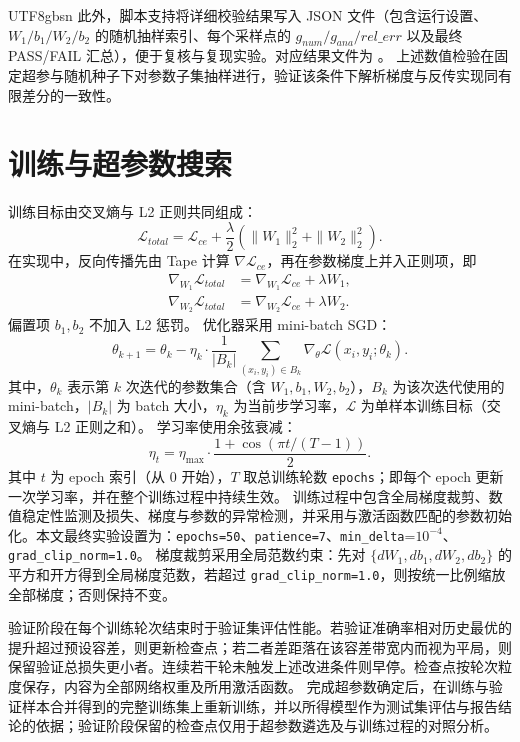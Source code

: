 \documentclass[11pt]{article}
\begin{document}
\begin{CJK*}{UTF8}{gbsn}
此外，脚本支持将详细校验结果写入 JSON 文件（包含运行设置、$W_1/b_1/W_2/b_2$ 的随机抽样索引、每个采样点的 $g_{num}/g_{ana}/rel\_err$ 以及最终 PASS/FAIL 汇总），便于复核与复现实验。对应结果文件为 。
上述数值检验在固定超参与随机种子下对参数子集抽样进行，验证该条件下解析梯度与反传实现同有限差分的一致性。

\section{训练与超参数搜索}
训练目标由交叉熵与 L2 正则共同组成：
\begin{equation*}
\mathcal{L}_{total}=\mathcal{L}_{ce}+\frac{\lambda}{2}\left(\|W_1\|_2^2+\|W_2\|_2^2\right).
\end{equation*}
在实现中，反向传播先由 Tape 计算 $\nabla \mathcal{L}_{ce}$，再在参数梯度上并入正则项，即
\[
\begin{aligned}
\nabla_{W_1}\mathcal{L}_{total}
&=\nabla_{W_1}\mathcal{L}_{ce}+\lambda W_1,\\
\nabla_{W_2}\mathcal{L}_{total}
&=\nabla_{W_2}\mathcal{L}_{ce}+\lambda W_2.
\end{aligned}
\]
偏置项 $b_1,b_2$ 不加入 L2 惩罚。
优化器采用 mini-batch SGD：
\begin{equation*}
\theta_{k+1}
=\theta_k-\eta_k\cdot \frac{1}{|B_k|}
\sum_{(x_i,y_i)\in B_k}\nabla_{\theta}\mathcal{L}(x_i,y_i;\theta_k).
\end{equation*}
其中，$\theta_k$ 表示第 $k$ 次迭代的参数集合（含 $W_1,b_1,W_2,b_2$），$B_k$ 为该次迭代使用的 mini-batch，$|B_k|$ 为 batch 大小，$\eta_k$ 为当前步学习率，$\mathcal{L}$ 为单样本训练目标（交叉熵与 L2 正则之和）。
学习率使用余弦衰减：
\begin{equation*}
\eta_t=\eta_{\max}\cdot\frac{1+\cos(\pi t/(T-1))}{2}.
\end{equation*}
其中 $t$ 为 epoch 索引（从 0 开始），$T$ 取总训练轮数 \texttt{epochs}；即每个 epoch 更新一次学习率，并在整个训练过程中持续生效。
训练过程中包含全局梯度裁剪、数值稳定性监测及损失、梯度与参数的异常检测，并采用与激活函数匹配的参数初始化。本文最终实验设置为：\texttt{epochs=50}、\texttt{patience=7}、\texttt{min\_delta}=$10^{-4}$、\texttt{grad\_clip\_norm=1.0}。
梯度裁剪采用全局范数约束：先对 $\{dW_1,db_1,dW_2,db_2\}$ 的平方和开方得到全局梯度范数，若超过 \texttt{grad\_clip\_norm=1.0}，则按统一比例缩放全部梯度；否则保持不变。

验证阶段在每个训练轮次结束时于验证集评估性能。若验证准确率相对历史最优的提升超过预设容差，则更新检查点；若二者差距落在该容差带宽内而视为平局，则保留验证总损失更小者。连续若干轮未触发上述改进条件则早停。检查点按轮次粒度保存，内容为全部网络权重及所用激活函数。
完成超参数确定后，在训练与验证样本合并得到的完整训练集上重新训练，并以所得模型作为测试集评估与报告结论的依据；验证阶段保留的检查点仅用于超参数遴选及与训练过程的对照分析。


\end{CJK*}
\end{document}

